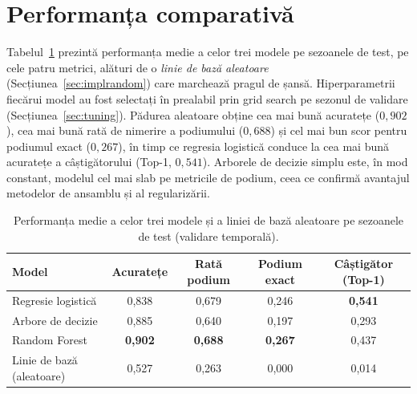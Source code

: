 \documentclass[12pt,a4paper]{report}
\begin{document}
\section{Performanța comparativă}
\label{sec:perf}

Tabelul~\ref{tab:rezultate} prezintă performanța medie a celor trei modele pe sezoanele de test,
pe cele patru metrici, alături de o \emph{linie de bază aleatoare} (Secțiunea~\ref{sec:implrandom})
care marchează pragul de șansă. Hiperparametrii fiecărui model au fost selectați în prealabil prin
grid search pe sezonul de validare (Secțiunea~\ref{sec:tuning}). Pădurea aleatoare obține cea mai bună
acuratețe ($0{,}902$), cea mai bună rată de nimerire a podiumului ($0{,}688$) și cel mai bun scor
pentru podiumul exact ($0{,}267$), în timp ce regresia logistică conduce la cea mai bună acuratețe
a câștigătorului (Top-1, $0{,}541$). Arborele de decizie simplu este, în mod constant, modelul cel
mai slab pe metricile de podium, ceea ce confirmă avantajul metodelor de ansamblu și al regularizării.

\begin{table}[htbp]
  \centering
  \begin{tabular}{l c c c c}
    \toprule
    \textbf{Model} & \textbf{Acuratețe} & \textbf{Rată podium} &
    \textbf{Podium exact} & \textbf{Câștigător (Top-1)} \\
    \midrule
    Regresie logistică & 0,838 & 0,679 & 0,246 & \textbf{0,541} \\
    Arbore de decizie  & 0,885 & 0,640 & 0,197 & 0,293 \\
    Random Forest      & \textbf{0,902} & \textbf{0,688} & \textbf{0,267} & 0,437 \\
    \midrule
    Linie de bază (aleatoare) & 0,527 & 0,263 & 0,000 & 0,014 \\
    \bottomrule
  \end{tabular}
  \caption{Performanța medie a celor trei modele și a liniei de bază aleatoare pe sezoanele de test
    (validare temporală).}
  \label{tab:rezultate}
\end{table}
\end{document}
